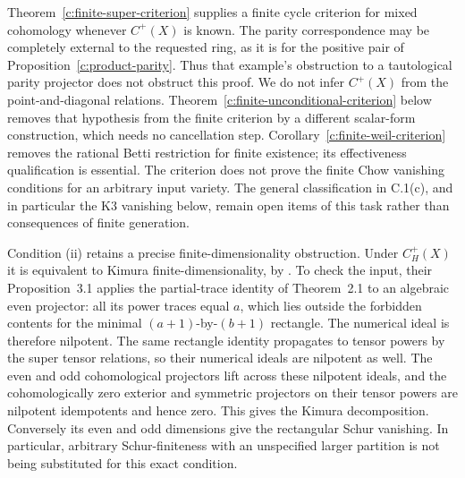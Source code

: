 \begin{remark}
\label{c:super-criterion-scope}
Theorem~\ref{c:finite-super-criterion} supplies a finite cycle
criterion for mixed cohomology whenever $C^+(X)$ is known.  The
parity correspondence may be completely external to the requested
ring, as it is for the positive pair of
Proposition~\ref{c:product-parity}.  Thus that example's obstruction
to a tautological parity projector does not obstruct this proof.
We do not infer $C^+(X)$ from the point-and-diagonal relations.
Theorem~\ref{c:finite-unconditional-criterion} below removes that
hypothesis from the finite criterion by a different scalar-form
construction, which needs no cancellation step.
Corollary~\ref{c:finite-weil-criterion} removes the rational Betti
restriction for finite existence; its effectiveness qualification
is essential.
The criterion does not prove the finite Chow vanishing conditions
for an arbitrary input variety.  The general classification in
C.1(c), and in particular the K3 vanishing below, remain open
items of this task rather than consequences of finite generation.

Condition (ii) retains a precise finite-dimensionality obstruction.
Under $C^+_H(X)$ it is equivalent to Kimura finite-dimensionality,
by \citet[Theorem~3.2, p.~286]{c_delpadronemazza2005}.
To check the input, their Proposition~3.1 applies the partial-trace
identity of Theorem~2.1 to an algebraic even projector: all its
power traces equal $a$, which lies outside the forbidden contents
for the minimal $(a+1)$-by-$(b+1)$ rectangle.  The numerical ideal
is therefore nilpotent.  The same rectangle identity propagates
to tensor powers by the super tensor relations, so their
numerical ideals are nilpotent as well.  The even and odd
cohomological projectors lift across these nilpotent ideals, and
the cohomologically zero exterior and symmetric projectors on
their tensor powers are nilpotent idempotents and hence zero.
This gives the Kimura decomposition.  Conversely its even and
odd dimensions give the rectangular Schur vanishing.  In
particular, arbitrary Schur-finiteness with an unspecified larger
partition is not being substituted for this exact condition.
\end{remark}
